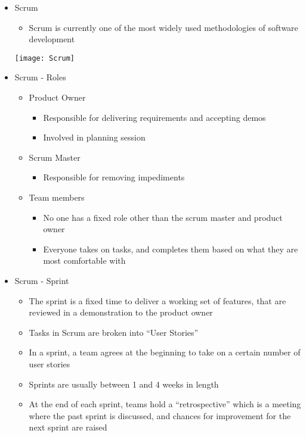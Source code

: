 \begin{itemize}
	\item Scrum
	\begin{itemize}
		\item Scrum is currently one of the most widely used methodologies of software development\\[-15pt]
	\end{itemize}
	\begin{center}
		\texttt{[image: Scrum]}
	\end{center}

	\item Scrum - Roles
	\begin{itemize}
		\item Product Owner
		\begin{itemize}
			\item Responsible for delivering requirements and accepting demos
			\item Involved in planning session
		\end{itemize}
		\item Scrum Master
		\begin{itemize}
			\item Responsible for removing impediments
		\end{itemize}
		\item Team members
		\begin{itemize}
			\item No one has a fixed role other than the scrum master and product owner
			\item Everyone takes on tasks, and completes them based on what they are most comfortable with
		\end{itemize}
	\end{itemize}

	\item Scrum - Sprint
	\begin{itemize}
		\item The sprint is a fixed time to deliver a working set of features, that are reviewed in a demonstration to the product owner
		\item Tasks in Scrum are broken into “User Stories”
		\item In a sprint, a team agrees at the beginning to take on a certain
		number of user stories
		\item Sprints are usually between 1 and 4 weeks in length
		\item At the end of each sprint, teams hold a “retrospective” which is a meeting where the past sprint is discussed, and chances for improvement for the next sprint are raised
	\end{itemize}


\end{itemize}
